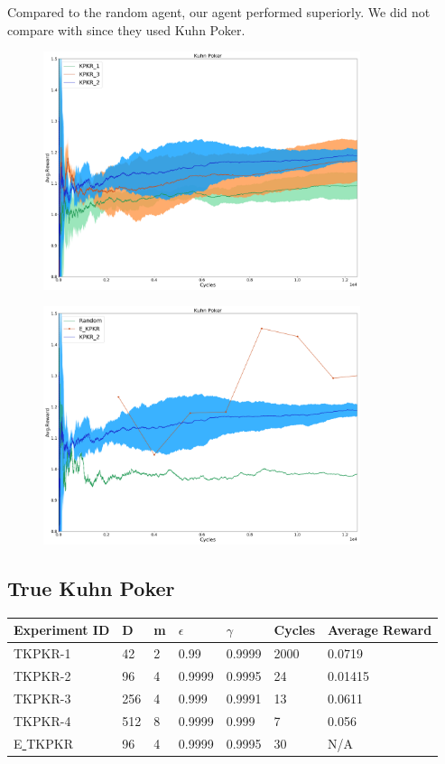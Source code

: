 \documentclass{article}
\theoremstyle{definition}
\newtheorem{primary statistics}[definition]{Primary Statistics}
\newtheorem{auxiliary statistics}[definition]{Auxiliary Statistics}
\begin{document}
Compared to the random agent, our agent performed superiorly. We did not compare with \citep{veness2011monte} since they used Kuhn Poker.

 \begin{figure}[h]
 \centering
    \includegraphics[width=9.3cm]{4_Kuhn_Poker}
\end{figure}

 \begin{figure}[h]
 \centering
    \includegraphics[width=9.3cm]{Kuhn_Poker}
\end{figure}

\newpage

\subsection{True Kuhn Poker}
\begin{tabular}{|l|l|l|l|l|l|l|}
\hline \centering
 Experiment ID& D & m & $\epsilon$ & $\gamma$ & Cycles & Average Reward \\ \hline
TKPKR-1  & 42        & 2           & 0.99        & 0.9999            & 2000   & 0.0719        \\ \hline
TKPKR-2  & 96        & 4           & 0.9999      & 0.9995            & 24     & 0.01415         \\ \hline
TKPKR-3  & 256       & 4           & 0.999       & 0.9991            & 13     & 0.0611         \\ \hline
TKPKR-4  & 512       & 8           & 0.9999      & 0.999             & 7      & 0.056      \\ \hline 
E\underline{ }TKPKR  & 96       & 4           & 0.9999      & 0.9995             & 30      & N/A      \\ \hline        
\end{tabular}
\end{document}
